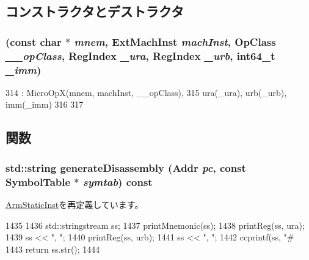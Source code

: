 \subsection{コンストラクタとデストラクタ}
\hypertarget{classArmISA_1_1MicroIntImmXOp_aaf906f3827f63cd0b3ffdbcee54e9dfd}{
\subsubsection[{MicroIntImmXOp}]{ (const char $\ast$ {\em mnem}, \/  {\bf ExtMachInst} {\em machInst}, \/  OpClass {\em \_\-\_\-opClass}, \/  {\bf RegIndex} {\em \_\-ura}, \/  {\bf RegIndex} {\em \_\-urb}, \/  int64\_\-t {\em \_\-imm})}}
\label{classArmISA_1_1MicroIntImmXOp_aaf906f3827f63cd0b3ffdbcee54e9dfd}



\begin{DoxyCode}
314             : MicroOpX(mnem, machInst, __opClass),
315               ura(_ura), urb(_urb), imm(_imm)
316     {
317     }
\end{DoxyCode}


\subsection{関数}
\hypertarget{classArmISA_1_1MicroIntImmXOp_a95d323a22a5f07e14d6b4c9385a91896}{
\subsubsection[{generateDisassembly}]{\setlength{\rightskip}{0pt plus 5cm}std::string generateDisassembly ({\bf Addr} {\em pc}, \/  const SymbolTable $\ast$ {\em symtab}) const}}
\label{classArmISA_1_1MicroIntImmXOp_a95d323a22a5f07e14d6b4c9385a91896}


\hyperlink{classArmISA_1_1ArmStaticInst_a95d323a22a5f07e14d6b4c9385a91896}{ArmStaticInst}を再定義しています。


\begin{DoxyCode}
1435 {
1436     std::stringstream ss;
1437     printMnemonic(ss);
1438     printReg(ss, ura);
1439     ss << ", ";
1440     printReg(ss, urb);
1441     ss << ", ";
1442     ccprintf(ss, "#%
1443     return ss.str();
1444 }
\end{DoxyCode}


